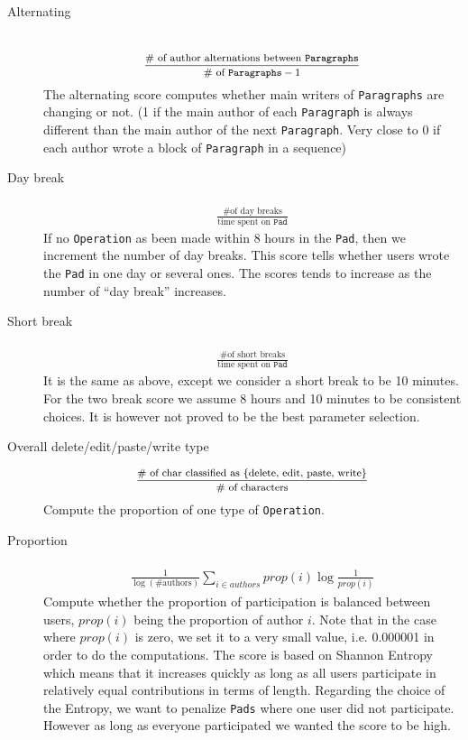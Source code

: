 \documentclass[a4, twocolumn, 12pt]{article}
\begin{document}
\begin{description}
\item [Alternating] 
\begin{align*}
\\
    \medmath{\frac{\text{\# of author alternations between }\texttt{Paragraphs}}{\text{\# of }\texttt{Paragraphs} - 1 }}
\end{align*}
The alternating score computes whether main writers of \texttt{Paragraphs} are changing or not. (1 if the main author of each \texttt{Paragraph} is always different than the main author of the next \texttt{Paragraph}. Very close to 0 if each author wrote a block of \texttt{Paragraph} in a sequence)
\item [Day break] 
\begin{align*}
\\
    \frac{\text{\# of day breaks}}{\text{time spent on }\texttt{Pad}}
\end{align*}
If no \texttt{Operation} as been made within 8 hours in the \texttt{Pad}, then we increment the number of day breaks. This score tells whether users wrote the \texttt{Pad} in one day or several ones. The scores tends to increase as the number of “day break” increases.
\item [Short break]
\begin{align*}
\\
    \frac{\text{\# of short breaks}}{\text{time spent on }\texttt{Pad}}
\end{align*}
It is the same as above, except we consider a short break to be 10 minutes. For the two break score we assume 8 hours and 10 minutes to be consistent choices. It is however not proved to be the best parameter selection.
\item [Overall delete/edit/paste/write type] 
\begin{align*}
    \medmath{\frac{\text{\# of char classified as \{delete, edit, paste, write\}}}{\text{\# of characters}}}
\end{align*}
Compute the proportion of one type of \texttt{Operation}.
\item [Proportion] 
\begin{align*}
\\
    \frac{1}{\log (\text{\#authors})}\sum_{i \in authors} prop(i)\log \frac{1}{prop(i)}
\end{align*}
Compute whether the proportion of participation is balanced between users, $prop(i)$ being the proportion of author $i$. Note that in the case where $prop(i)$ is zero, we set it to a very small value, i.e. 0.000001 in order to do the computations. The score is based on Shannon Entropy which means that it increases quickly as long as all users participate in relatively equal contributions in terms of length. Regarding the choice of the Entropy, we want to penalize \texttt{Pads} where one user did not participate. However as long as everyone participated we wanted the score to be high.

\end{description}
\end{document}
